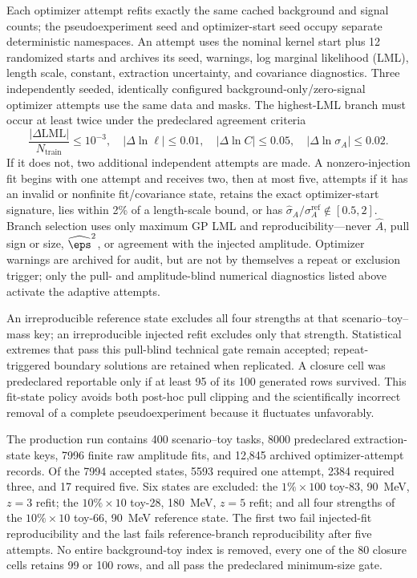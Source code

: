Each optimizer attempt refits exactly the same cached background and signal counts;
the pseudoexperiment seed and optimizer-start seed occupy separate deterministic
namespaces.  An attempt uses the nominal kernel start plus 12 randomized starts and
archives its seed, warnings, log marginal likelihood (LML), length scale, constant,
extraction uncertainty, and covariance diagnostics.  Three independently seeded,
identically configured background-only/zero-signal optimizer attempts use the same
data and masks.  The highest-LML branch
must occur at least twice under the predeclared agreement criteria
\begin{equation}
 \frac{|\Delta\mathrm{LML}|}{N_{\mathrm{train}}}\leq10^{-3},\quad
 |\Delta\ln\ell|\leq0.01,\quad
 |\Delta\ln C|\leq0.05,\quad
 |\Delta\ln\sigma_A|\leq0.02.
 \label{eq:v501-v4p6-branch-replication}
\end{equation}
If it does not, two additional independent attempts are made.  A nonzero-injection
fit begins with one attempt and receives two, then at most five, attempts if it has an
invalid or nonfinite fit/covariance state, retains the exact optimizer-start signature, lies
within 2\% of a length-scale bound, or has
$\widehat\sigma_A/\sigma_A^{\mathrm{ref}}\notin[0.5,2]$.  Branch selection uses only
maximum GP LML and reproducibility---never $\widehat A$, pull sign or size,
$\widehat\eps^2$, or agreement with the injected amplitude.
Optimizer warnings are archived for audit, but are not by themselves a repeat or
exclusion trigger; only the pull- and amplitude-blind numerical diagnostics listed above
activate the adaptive attempts.

An irreproducible reference state excludes all four strengths at that
scenario--toy--mass key; an irreproducible injected refit excludes only that strength.
Statistical extremes that pass this pull-blind technical gate remain accepted;
repeat-triggered boundary solutions are retained when replicated.  A closure cell
was predeclared reportable only if at least 95 of its 100 generated rows survived.
This fit-state policy avoids both post-hoc pull clipping and the scientifically
incorrect removal of a complete pseudoexperiment because it fluctuates unfavorably.

The production run contains 400 scenario--toy tasks, 8000 predeclared extraction-state
keys, 7996 finite raw amplitude fits, and 12,845 archived optimizer-attempt records.
Of the 7994 accepted states,
5593 required one attempt, 2384 required three, and 17 required five.  Six states are
excluded: the $1\%\times100$ toy-83, 90~MeV, $z=3$ refit; the $10\%\times10$
toy-28, 180~MeV, $z=5$ refit; and all four strengths of the $10\%\times10$ toy-66,
90~MeV reference state.  The first two fail injected-fit reproducibility and the last
fails reference-branch reproducibility after five attempts.  No entire background-toy
index is removed, every one of the 80 closure cells retains 99 or 100 rows, and all pass the
predeclared minimum-size gate.

